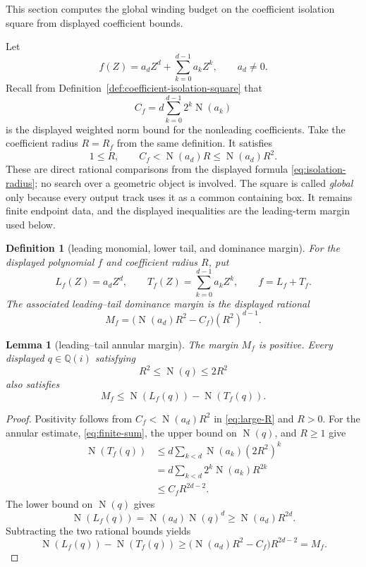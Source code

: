 \documentclass[11pt]{article}
\newtheorem{lemma}[theorem]{Lemma}
\newtheorem{definition}[theorem]{Definition}
\newcommand{\Qi}{\mathbb{Q}(i)}
\newcommand{\Norm}[1]{\operatorname{N}\!\left(#1\right)}
\newcommand{\Defref}[1]{Definition~\ref{#1}}
\begin{document}
This section computes the global winding budget on the coefficient isolation
square from displayed coefficient bounds.

Let
\[
       f(Z)=a_dZ^d+\sum_{k=0}^{d-1}a_kZ^k,
       \qquad a_d\ne0.
\]
Recall from \Defref{def:coefficient-isolation-square} that
\[
              C_f=d\sum_{k=0}^{d-1}2^k\Norm{a_k}
\]
is the displayed weighted norm bound for the nonleading coefficients.  Take
the coefficient radius $R=R_f$ from the same definition.  It satisfies
\begin{equation}
\label{eq:large-R}
             1\le R,\qquad C_f<\Norm{a_d}R\le\Norm{a_d}R^2.
\end{equation}
These are direct rational comparisons from the displayed formula
\eqref{eq:isolation-radius}; no search over a geometric object is involved.
The square is called \emph{global} only because every output track uses it as
a common containing box.  It remains finite endpoint data, and the displayed
inequalities are the leading-term margin used below.

\begin{definition}[leading monomial, lower tail, and dominance margin]
\label{def:leading-tail-margin}
For the displayed polynomial $f$ and coefficient radius $R$, put
\[
 L_f(Z)=a_dZ^d,
 \qquad
 T_f(Z)=\sum_{k=0}^{d-1}a_kZ^k,
 \qquad
 f=L_f+T_f.
\]
The associated \emph{leading--tail dominance margin} is the displayed
rational
\[
 M_f=\bigl(\Norm{a_d}R^2-C_f\bigr)(R^2)^{d-1}.
\]
\end{definition}

\begin{lemma}[leading--tail annular margin]
\label{lem:leading-tail-annular-margin}
The margin $M_f$ is positive.  Every displayed $q\in\Qi$ satisfying
\[
                   R^2\le\Norm q\le2R^2
\]
also satisfies
\[
       M_f\le \Norm{L_f(q)}-\Norm{T_f(q)}.
\]
\end{lemma}

\begin{proof}
Positivity follows from $C_f<\Norm{a_d}R^2$ in \eqref{eq:large-R} and
$R>0$.  For the annular estimate, \eqref{eq:finite-sum}, the upper bound on
$\Norm q$, and $R\ge1$ give
\[
\begin{aligned}
 \Norm{T_f(q)}
 &\le d\sum_{k<d}\Norm{a_k}(2R^2)^k\\
 &=d\sum_{k<d}2^k\Norm{a_k}R^{2k}\\
 &\le C_fR^{2d-2}.
\end{aligned}
\]
The lower bound on $\Norm q$ gives
\[
       \Norm{L_f(q)}=\Norm{a_d}\Norm q^d
       \ge\Norm{a_d}R^{2d}.
\]
Subtracting the two rational bounds yields
\[
 \Norm{L_f(q)}-\Norm{T_f(q)}
 \ge\bigl(\Norm{a_d}R^2-C_f\bigr)R^{2d-2}=M_f.
\]
\end{proof}
\end{document}
